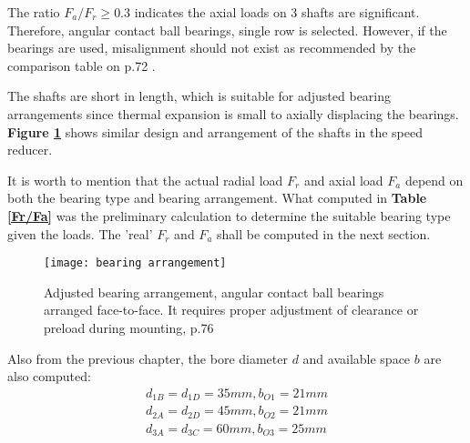 The ratio $ F_a/F_r \geq 0.3 $ indicates the axial loads on 3 shafts are significant. Therefore, angular contact ball bearings, single row is selected. However, if the bearings are used, misalignment should not exist as recommended by the comparison table on p.72 \cite{rolling_bearings}.

The shafts are short in length, which is suitable for adjusted bearing arrangements since thermal expansion is small to axially displacing the bearings. \textbf{Figure \ref{bearing arrangement}} shows similar design and arrangement of the shafts in the speed reducer.

It is worth to mention that the actual radial load $ F_r $ and axial load $ F_a $ depend on both the bearing type and bearing arrangement. What computed in \textbf{Table \ref{Fr/Fa}} was the preliminary calculation to determine the suitable bearing type given the loads. The 'real' $ F_r $ and $ F_a $ shall be computed in the next section.

\begin{figure}[ht]
	\centering
	\texttt{[image: bearing arrangement]}
	\caption{Adjusted bearing arrangement, angular contact ball bearings arranged face-to-face. It requires proper adjustment of clearance or preload during mounting, p.76 \cite{rolling_bearings}}
	\label{bearing arrangement}
\end{figure}

Also from the previous chapter, the bore diameter $ d $ and available space $ b $ are also computed:
\[
\begin{array}{l}
d_{1B} = d_{1D} = 35 \unit{mm}, b_{O1} = 21 \unit{mm}\\
d_{2A} = d_{2D} = 45 \unit{mm}, b_{O2} = 21 \unit{mm}\\
d_{3A} = d_{3C} = 60 \unit{mm}, b_{O3} = 25 \unit{mm}\\
\end{array}
\]

